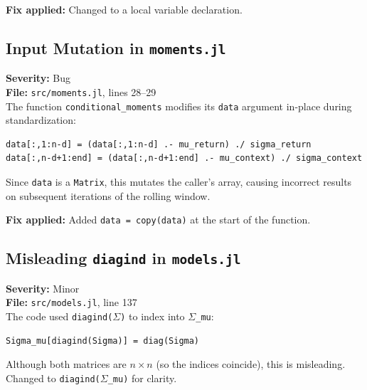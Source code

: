 \documentclass[11pt,a4paper]{article}
\begin{document}
\textbf{Fix applied:} Changed to a local variable declaration.

\subsection{Input Mutation in \texttt{moments.jl}}
\label{sec:mutation}

\textbf{Severity:} Bug\\
\textbf{File:} \texttt{src/moments.jl}, lines 28--29\\[0.3em]
The function \texttt{conditional\_moments} modifies its \texttt{data} argument
in-place during standardization:

\begin{lstlisting}
data[:,1:n-d] = (data[:,1:n-d] .- mu_return) ./ sigma_return
data[:,n-d+1:end] = (data[:,n-d+1:end] .- mu_context) ./ sigma_context
\end{lstlisting}

Since \texttt{data} is a \texttt{Matrix}, this mutates the caller's array, causing
incorrect results on subsequent iterations of the rolling window.

\textbf{Fix applied:} Added \texttt{data = copy(data)} at the start of the function.

\subsection{Misleading \texttt{diagind} in \texttt{models.jl}}
\label{sec:diagind}

\textbf{Severity:} Minor\\
\textbf{File:} \texttt{src/models.jl}, line 137\\[0.3em]
The code used \texttt{diagind($\Sigma$)} to index into \texttt{$\Sigma$\_mu}:

\begin{lstlisting}
Sigma_mu[diagind(Sigma)] = diag(Sigma)
\end{lstlisting}

Although both matrices are $n \times n$ (so the indices coincide), this is
misleading. Changed to \texttt{diagind($\Sigma$\_mu)} for clarity.

\end{document}
